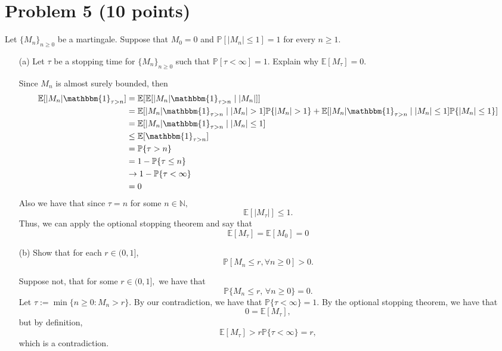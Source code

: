 \documentclass[11pt]{article}
\newcommand{\bbE}{\mathbb{E}}
\newcommand{\bbN}{\mathbb{N}}
\newcommand{\bbP}{\mathbb{P}}
\begin{document}
\newpage

\section*{Problem 5 (10 points)}
Let \(\{M_n\}_{n \geq 0}\) be a martingale. Suppose that \(M_0 = 0\) and \(\mathbb{P}[|M_n| \leq 1] = 1\) for every \(n \geq 1\).

\begin{itemize}
    \item[(a)] Let \(\tau\) be a stopping time for \(\{M_n\}_{n \geq 0}\) such that \(\mathbb{P}[\tau < \infty] = 1\). Explain why \(\mathbb{E}[M_\tau] = 0\).
    \begin{solution}
        Since $M_n$ is almost surely bounded, then 
        \begin{align*}
            \bbE[|M_n|\mathbbm{1}_{\tau >n}] &=\bbE[\bbE[|M_n|\mathbbm{1}_{\tau >n} \mid |M_n|]]\\
            &= \bbE[|M_n| \mathbbm{1}_{\tau>n} \mid |M_n| >1]\bbP\{|M_n| >1 \} + \bbE[|M_n|\mathbbm{1}_{\tau>n} \mid |M_n| \leq 1]\bbP\{|M_n| \leq 1 \}]\\
            &= \bbE[|M_n|\mathbbm{1}_{\tau>n} \mid |M_n| \leq 1]\\
            &\leq \bbE[\mathbbm{1}_{\tau >n}]\\
            &= \bbP\{\tau >n\}\\
            &= 1- \bbP\{\tau \leq n\}\\
            &\to 1- \bbP\{\tau < \infty\}\\
            &= 0
        \end{align*}
        Also we have that since $\tau = n$ for some $n \in \bbN,$
        \[\bbE[|M_\tau|] \leq 1.\] Thus, we can apply the optional stopping theorem and say that 
        \[\bbE[M_\tau]= \bbE[M_0] = 0\]
    \end{solution}
    \item[(b)] Show that for each \(r \in (0, 1]\),
    \[
    \mathbb{P}[M_n \leq r, \forall n \geq 0] > 0.
    \]
    \begin{solution}
        Suppose not, that for some $r \in (0,1],$ we have that 
        \[\bbP\{M_n \leq r, \,\forall  n \geq 0\} = 0.\] Let $\tau:= \min\{n \geq 0 : M_n >r\}.$ By our contradiction, we have that $\bbP\{\tau < \infty\} = 1.$ By the optional stopping theorem, we have that 
        \[0 = \bbE[M_\tau],\] but by definition, 
        \[\bbE[M_\tau] > r \bbP\{\tau < \infty\} = r,\] which is a contradiction.
    \end{solution}
\end{itemize}
\end{document}

